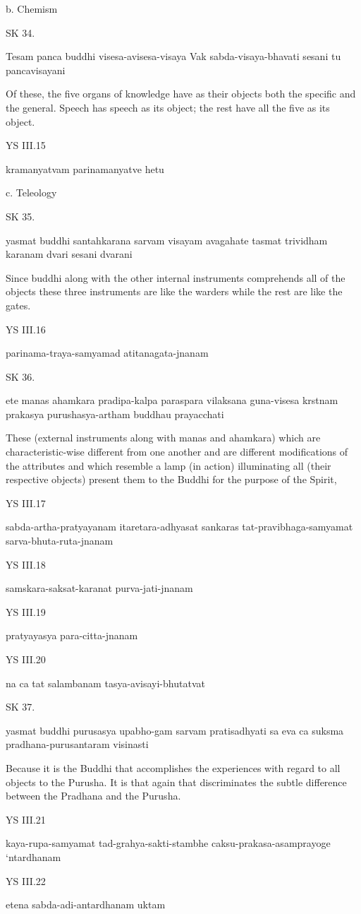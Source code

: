     b. Chemism

SK 34.

Tesam panca buddhi visesa-avisesa-visaya
Vak sabda-visaya-bhavati sesani tu pancavisayani

Of these, the five organs of knowledge have as their objects
both the specific and the general.
Speech has speech as its object;
the rest have all the five as its object.

YS III.15

    kramanyatvam parinamanyatve hetu

    c. Teleology

SK 35.


yasmat buddhi santahkarana sarvam visayam avagahate
tasmat trividham karanam dvari sesani dvarani

Since buddhi along with the other internal instruments
comprehends all of the objects these three instruments are
like the warders while the rest are like the gates.

YS III.16

    parinama-traya-samyamad atitanagata-jnanam

SK 36.

ete manas ahamkara pradipa-kalpa paraspara vilaksana
guna-visesa krstnam prakasya purushasya-artham buddhau prayacchati

These (external instruments along with manas and ahamkara)
which are characteristic-wise different from one another
and are different modifications of the attributes
and which resemble a lamp (in action) illuminating all (their respective objects)
present them to the Buddhi for the purpose of the Spirit,

YS III.17

    sabda-artha-pratyayanam itaretara-adhyasat sankaras tat-pravibhaga-samyamat sarva-bhuta-ruta-jnanam

YS III.18

    samskara-saksat-karanat purva-jati-jnanam

YS III.19

    pratyayasya para-citta-jnanam

YS III.20

    na ca tat salambanam tasya-avisayi-bhutatvat

SK 37.

yasmat buddhi purusasya upabho-gam sarvam pratisadhyati
sa eva ca suksma pradhana-purusantaram visinasti

Because it is the Buddhi that accomplishes the experiences
with regard to all objects to the Purusha.
It is that again that discriminates the subtle difference
between the Pradhana and the Purusha.

YS III.21

    kaya-rupa-samyamat tad-grahya-sakti-stambhe caksu-prakasa-asamprayoge ‘ntardhanam

YS III.22

    etena sabda-adi-antardhanam uktam

